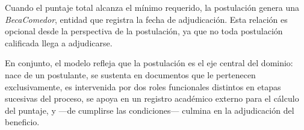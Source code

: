 Cuando el puntaje total alcanza el mínimo requerido, la postulación genera una \textit{BecaComedor}, entidad que registra la fecha de adjudicación. Esta relación es opcional desde la perspectiva de la postulación, ya que no toda postulación calificada llega a adjudicarse.

En conjunto, el modelo refleja que la postulación es el eje central del dominio: nace de un postulante, se sustenta en documentos que le pertenecen exclusivamente, es intervenida por dos roles funcionales distintos en etapas sucesivas del proceso, se apoya en un registro académico externo para el cálculo del puntaje, y —de cumplirse las condiciones— culmina en la adjudicación del beneficio.
